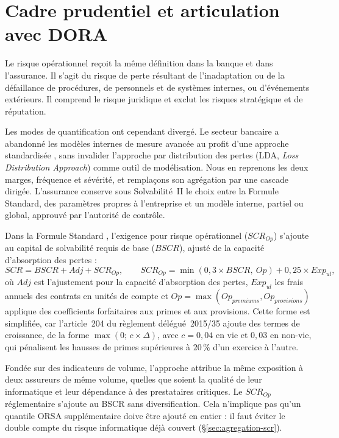 \section{Cadre prudentiel et articulation avec DORA}
\label{chap:reglementaire}


Le risque opérationnel reçoit la même définition dans la banque et dans l'assurance. Il s'agit du
risque de perte résultant de l'inadaptation ou de la défaillance de procédures, de personnels et de
systèmes internes, ou d'événements extérieurs. Il comprend le risque juridique et exclut les risques
stratégique et de réputation.

Les modes de quantification ont cependant divergé. Le secteur bancaire a abandonné les
modèles internes de mesure avancée au profit d'une approche standardisée \citep{bcbs2017}, sans invalider l'approche
par distribution des pertes (LDA, \emph{Loss Distribution Approach}) comme outil de modélisation.
Nous en reprenons les deux marges, fréquence et sévérité, et remplaçons son agrégation par une
cascade dirigée. L'assurance conserve sous Solvabilité~II le choix entre la Formule Standard, des
paramètres propres à l'entreprise et un modèle interne, partiel ou global, approuvé par l'autorité de
contrôle.

Dans la Formule Standard \citep{SolvabiliteII2009, eu2015_35}, l'exigence pour risque opérationnel ($SCR_{Op}$) s'ajoute au capital de
solvabilité requis de base ($BSCR$), ajusté de la capacité d'absorption des pertes :
\begin{equation}
SCR = BSCR + Adj + SCR_{Op},
\qquad
SCR_{Op} = \min(0{,}3 \times BSCR,\ Op) + 0{,}25 \times Exp_{ul},
\label{reg:eq:scrop}
\end{equation}
où $Adj$ est l'ajustement pour la capacité d'absorption des pertes, $Exp_{ul}$ les frais annuels des contrats en unités de compte et $Op = \max(Op_{premiums}, Op_{provisions})$ applique des coefficients forfaitaires aux primes et
aux provisions. Cette forme est simplifiée, car l'article~204 du règlement délégué~2015/35 ajoute des
termes de croissance, de la forme $\max\!\left(0;\, c \times \Delta\!\right)$, avec $c=0{,}04$ en vie et $0{,}03$ en non-vie, qui pénalisent
les hausses de primes supérieures à $20\,\%$ d'un exercice à l'autre.

Fondée sur des indicateurs de
volume, l'approche attribue la même exposition à deux assureurs de même volume, quelles que soient la
qualité de leur informatique et leur dépendance à des prestataires critiques. Le $SCR_{Op}$ réglementaire s'ajoute au BSCR sans diversification. Cela n'implique pas qu'un quantile ORSA supplémentaire doive être ajouté en entier : il faut éviter le double compte du risque informatique déjà couvert (\S\ref{sec:agregation-scr}).

